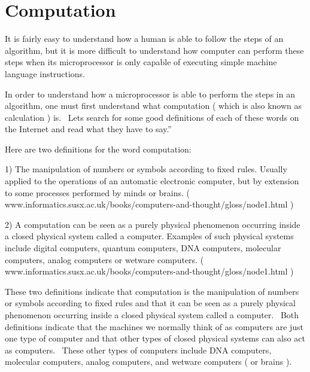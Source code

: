 \documentclass[12pt,twoside]{book}
\begin{document}
\section[Computation]{Computation}
It is fairly easy to understand how a human is able to follow the steps
of an algorithm, but it is more difficult to understand how computer
can perform these steps when its microprocessor is only capable of
executing simple machine language instructions.


\bigskip

In order to understand how a microprocessor is able to perform the steps
in an algorithm, one must first understand what computation ( which is
also known as calculation ) is. \ Lets search for some good definitions
of each of these words on the Internet and read what they have to
say.''


\bigskip

Here are two definitions for the word computation:


\bigskip

1) The manipulation of numbers or symbols according to fixed rules.
Usually applied to the operations of an automatic electronic computer,
but by extension to some processes performed by minds or brains. (
www.informatics.susx.ac.uk/books/computers{}-and{}-thought/gloss/node1.html
)


\bigskip

2) A computation can be seen as a purely physical phenomenon occurring
inside a closed physical system called a computer. Examples of such
physical systems include digital computers, quantum computers, DNA
computers, molecular computers, analog computers or wetware computers.
(
www.informatics.susx.ac.uk/books/computers{}-and{}-thought/gloss/node1.html
)


\bigskip


\bigskip

These two definitions indicate that computation is the
{\textquotedbl}manipulation of numbers or symbols according to fixed
rules{\textquotedbl} and that it {\textquotedbl}can be seen as a purely
physical phenomenon occurring inside a closed physical system called a
computer.{\textquotedbl} \ Both definitions indicate that the machines
we normally think of as computers are just one type of computer and
that other types of closed physical systems can also act as computers.
\ These other types of computers include DNA computers, molecular
computers, analog computers, and wetware computers ( or brains ).


\bigskip
\end{document}
